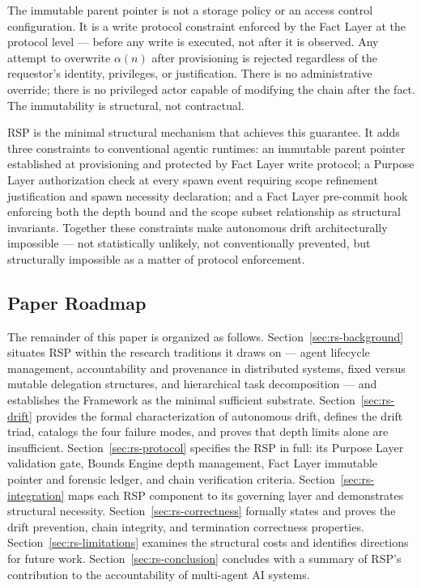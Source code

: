 The immutable parent pointer is not a storage policy or an access control configuration. It is a write protocol constraint enforced by the Fact Layer at the protocol level — before any write is executed, not after it is observed. Any attempt to overwrite $\alpha(n)$ after provisioning is rejected regardless of the requestor's identity, privileges, or justification. There is no administrative override; there is no privileged actor capable of modifying the chain after the fact. The immutability is structural, not contractual.

RSP is the minimal structural mechanism that achieves this guarantee. It adds three constraints to conventional agentic runtimes: an immutable parent pointer established at provisioning and protected by Fact Layer write protocol; a Purpose Layer authorization check at every spawn event requiring scope refinement justification and spawn necessity declaration; and a Fact Layer pre-commit hook enforcing both the depth bound and the scope subset relationship as structural invariants. Together these constraints make autonomous drift architecturally impossible — not statistically unlikely, not conventionally prevented, but structurally impossible as a matter of protocol enforcement.

\subsection{Paper Roadmap}

The remainder of this paper is organized as follows. Section~\ref{sec:rs-background} situates RSP within the research traditions it draws on — agent lifecycle management, accountability and provenance in distributed systems, fixed versus mutable delegation structures, and hierarchical task decomposition — and establishes the \bxthree{} Framework as the minimal sufficient substrate. Section~\ref{sec:rs-drift} provides the formal characterization of autonomous drift, defines the drift triad, catalogs the four failure modes, and proves that depth limits alone are insufficient. Section~\ref{sec:rs-protocol} specifies the RSP in full: its Purpose Layer validation gate, Bounds Engine depth management, Fact Layer immutable pointer and forensic ledger, and chain verification criteria. Section~\ref{sec:rs-integration} maps each RSP component to its governing \bxthree{} layer and demonstrates structural necessity. Section~\ref{sec:rs-correctness} formally states and proves the drift prevention, chain integrity, and termination correctness properties. Section~\ref{sec:rs-limitations} examines the structural costs and identifies directions for future work. Section~\ref{sec:rs-conclusion} concludes with a summary of RSP's contribution to the accountability of multi-agent AI systems.
